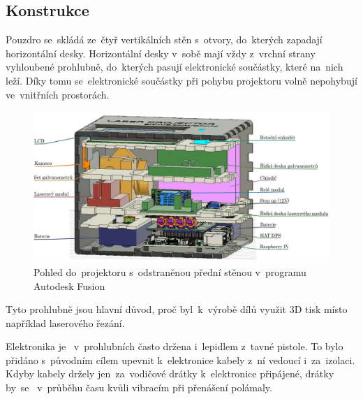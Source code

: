 \subsection{Konstrukce}
Pouzdro se~skládá ze~čtyř vertikálních stěn s~otvory, do~kterých zapadají horizontální desky. Horizontální desky v~sobě mají vždy z~vrchní strany vyhloubené prohlubně, do~kterých pasují elektronické součástky, které na~nich leží. Díky tomu se~elektronické součástky při pohybu projektoru volně nepohybují ve~vnitřních prostorách.

\begin{figure}[htb]
  \centering
  \includegraphics[width=1\textwidth]{img/case-sideview.jpg}
  \caption{\label{fig:case-sideview} Pohled do~projektoru s~odstraněnou přední stěnou v~programu Autodesk Fusion}
\end{figure}

Tyto prohlubně jsou hlavní důvod, proč byl~k~výrobě dílů využit 3D tisk místo například laserového řezání.

Elektronika je ~v~prohlubních často držena i~lepidlem z~tavné pistole.
To bylo přidáno s~původním cílem upevnit k~elektronice kabely z~ní vedoucí i~za~izolaci. Kdyby kabely držely jen~za~vodičové drátky k~elektronice připájené, drátky by~se ~v~průběhu času kvůli vibracím při přenášení polámaly.

